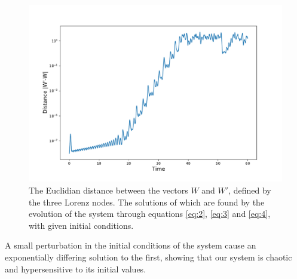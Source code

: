 \documentclass[10pt, letterpaper]{article}
\begin{document}
\begin{figure}[H]
    \hspace*{-5mm}
        \centering
        \includegraphics[width =\textwidth]{dist.pdf}
        \caption{The Euclidian distance between the vectors $W$ and $W'$, defined by the three Lorenz nodes. The solutions of which are found by the evolution of the system through equations \ref{eq:2}, \ref{eq:3} and \ref{eq:4}, with given initial conditions.}
        \label{fig:y3}
\end{figure}

A small perturbation in the initial conditions of the system cause an exponentially differing solution to the first, showing that our system is chaotic and hypersensitive to its initial values.
\end{document}
